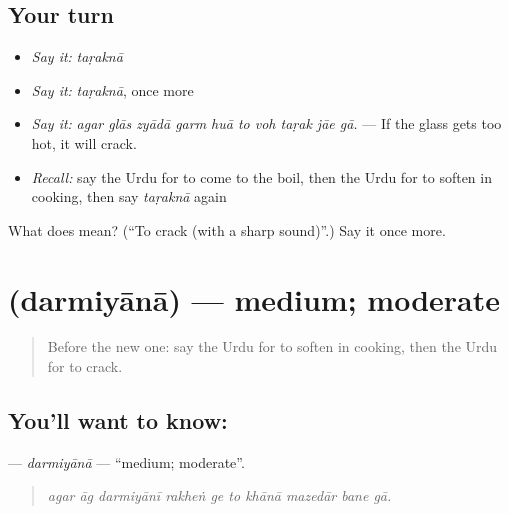 \subsection*{Your turn}
\begin{itemize}
\raggedright
  \item \emph{Say it:} \emph{taṛaknā}
  \item \emph{Say it:} \emph{taṛaknā}, once more
  \item \emph{Say it:} \emph{agar glās zyādā garm huā to voh taṛak jāe gā.} — If the glass gets too hot, it will crack.
  \item \emph{Recall:} say the Urdu for to come to the boil, then the Urdu for to soften in cooking, then say \emph{taṛaknā} again
\end{itemize}

\begin{tcolorbox}[breakable,colback=teal!4,colframe=teal!35!black,title={Before you move on}]
What does  mean? (\textquotedblleft{}To crack (with a sharp sound)\textquotedblright{}.) Say it once more.
\end{tcolorbox}
\section[\texorpdfstring{\ur{درمیانہ} (darmiyānā)}{درمیانہ (darmiyānā)}]{ (darmiyānā) — medium; moderate}

\label{lesson:UR-C372-darmiyana}



\begin{quote}
Before the new one: say the Urdu for to soften in cooking, then the Urdu for to crack.
\end{quote}

\subsection*{You'll want to know: }
\textbf{} — \emph{darmiyānā} — \textquotedblleft{}medium; moderate\textquotedblright{}.

\begin{quote}
         
\end{quote}

\begin{quote}
\emph{agar āg darmiyānī rakheṅ ge to khānā mazedār bane gā.}
\end{quote}

